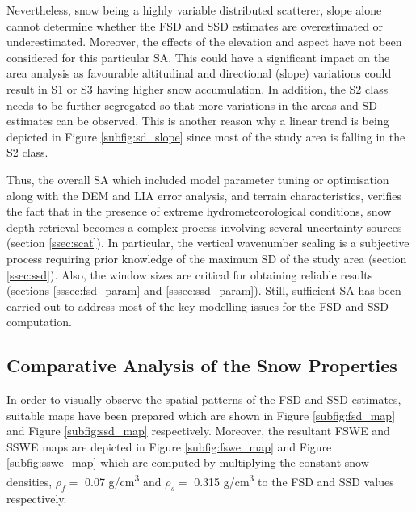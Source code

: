 \documentclass[review]{elsarticle}
\numberwithin{equation}{section}
\numberwithin{figure}{section}
\numberwithin{table}{section}
\begin{document}
Nevertheless, snow being a highly variable distributed scatterer, slope alone cannot determine whether the FSD and SSD estimates are overestimated or underestimated. Moreover, the effects of the elevation and aspect have not been considered for this particular SA. This could have a significant impact on the area analysis as favourable altitudinal and directional (slope) variations could result in S1 or S3 having higher snow accumulation. In addition, the S2 class needs to be further segregated so that more variations in the areas and SD estimates can be observed. This is another reason why a linear trend is being depicted in Figure \ref{subfig:sd_slope} since most of the study area is falling in the S2 class.

Thus, the overall SA which included model parameter tuning or optimisation along with the DEM and LIA error analysis, and terrain characteristics, verifies the fact that in the presence of extreme hydrometeorological conditions, snow depth retrieval becomes a complex process involving several uncertainty sources (section \ref{ssec:scat}). In particular, the vertical wavenumber scaling is a subjective process requiring prior knowledge of the maximum SD of the study area (section \ref{ssec:ssd}). Also, the window sizes are critical for obtaining reliable results (sections \ref{sssec:fsd_param} and \ref{sssec:ssd_param}). Still, sufficient SA has been carried out to address most of the key modelling issues for the FSD and SSD computation.

\subsection{Comparative Analysis of the Snow Properties}
\label{ssec:snow}

In order to visually observe the spatial patterns of the FSD and SSD estimates, suitable maps have been prepared which are shown in Figure \ref{subfig:fsd_map} and Figure \ref{subfig:ssd_map} respectively. Moreover, the resultant FSWE and SSWE maps are depicted in Figure \ref{subfig:fswe_map} and Figure \ref{subfig:sswe_map} which are computed by multiplying the constant snow densities, $\rho_f = $ 0.07 g/cm\textsuperscript{3} and $\rho_s = $ 0.315 g/cm\textsuperscript{3} to the FSD and SSD values respectively.
\end{document}
